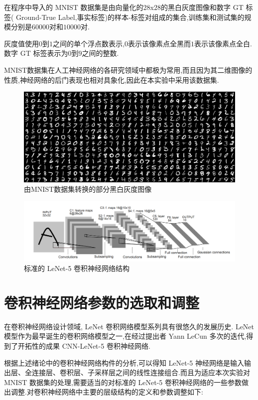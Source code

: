 在程序中导入的 MNIST 数据集是由向量化的$28$x$28$的黑白灰度图像和数字 GT 标签( Ground-True Label,事实标签)的样本-标签对组成的集合,训练集和测试集的规模分别是$60000$对和$10000$对.

灰度值使用$0$到$1$之间的单个浮点数表示,$0$表示该像素点全黑而$1$表示该像素点全白.数字 GT 标签表示为$0$到$9$之间的整数.

MNIST数据集在人工神经网络的各研究领域中都极为常用,而且因为其二维图像的性质,神经网络的后门表现也相对具象化,因此在本实验中采用该数据集.
\begin{figure}
	\centering
	\includegraphics[scale=0.4]{Figures/mnist.png}
	\caption{由MNIST数据集转换的部分黑白灰度图像}
\end{figure}
\begin{figure}
	\centering
	\includegraphics[scale=0.35]{Figures/lenet.png}
	\caption{标准的 LeNet-5 卷积神经网络结构}
\end{figure}

\section{卷积神经网络参数的选取和调整}

在卷积神经网络设计领域, LeNet 卷积网络模型系列具有很悠久的发展历史. LeNet 模型作为最早诞生的卷积网络模型之一,在经过提出者 Yann LeCun 多次的迭代,得到了开拓性的成果 CNN-LeNet-5 卷积神经网络.

根据上述绪论中的卷积神经网络构件的分析,可以得知 LeNet-5 神经网络是输入输出层、全连接层、卷积层、子采样层之间的线性连接组合.而且为适应本次实验对 MNIST 数据集的处理,需要适当的对标准的 LeNet-5 卷积神经网络的一些参数做出调整.对卷积神经网络中主要的层级结构的定义和参数调整如下:

